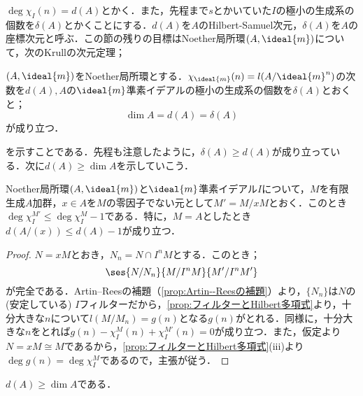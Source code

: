 $\deg\chi_I(n)=d(A)$とかく．また，先程まで$s$とかいていた$I$の極小の生成系の個数を$\delta(A)$とかくことにする．$d(A)$を$A$のHilbert-Samuel次元，$\delta(A)$を$A$の座標次元と呼ぶ．この節の残りの目標はNoether局所環$(A,\ideal{m})$について，次のKrullの次元定理；
\begin{thm}[Krullの次元定理]\label{thm:Krullの次元定理}
	$(A,\ideal{m})$をNoether局所環とする．$\chi_{\ideal{m}}(n)=l(A/\ideal{m}^n)$の次数を$d(A),A$の$\ideal{m}$準素イデアルの極小の生成系の個数を$\delta(A)$とおくと；
	\[\dim A=d(A)=\delta(A)\]
	が成り立つ．
\end{thm}

を示すことである．先程も注意したように，$\delta(A)\geq d(A)$が成り立っている．次に$d(A)\geq\dim A$を示していこう．

\begin{lem}\label{lem:商の特性多項式を上から抑える}
	Noether局所環$(A,\ideal{m})$と$\ideal{m}$準素イデアル$I$について，$M$を有限生成$A$加群，$x\in A$を$M$の零因子でない元として$M'=M/xM$とおく．このとき$\deg\chi_I^{M'}\leq\deg\chi_I^M-1$である．特に，$M=A$としたとき$d(A/(x))\leq d(A)-1$が成り立つ．
\end{lem}

\begin{proof}
	$N=xM$とおき，$N_n=N\cap I^nM$とする．このとき；
	\[\ses{N/N_n}{M/I^nM}{M'/I^nM'}\]
	が完全である．Artin--Reesの補題（\ref{prop:Artin--Reesの補題}）より，$\{N_n\}$は$N$の(安定している) $I$フィルターだから，\ref{prop:フィルターとHilbert多項式}より，十分大きな$n$について$l(M/M_n)=g(n)$となる$g(n)$がとれる．同様に，十分大きな$n$をとれば$g(n)-\chi_I^M(n)+\chi_I^{M'}(n)=0$が成り立つ．また，仮定より$N=xM\cong M$であるから，\ref{prop:フィルターとHilbert多項式}(iii)より$\deg g(n)=\deg\chi_I^M$であるので，主張が従う．
\end{proof}

\begin{prop}\label{prop:d(A)geq dim A}
	$d(A)\geq\dim A$である．
\end{prop}

